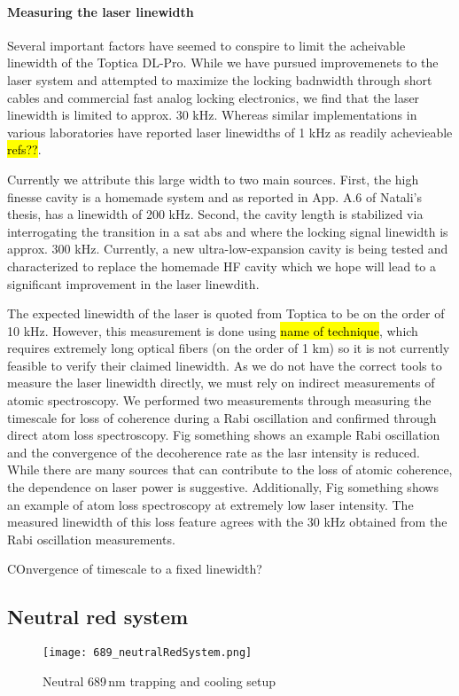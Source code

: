 \paragraph{Measuring the laser linewidth}
Several important factors have seemed to conspire to limit the acheivable linewidth of the Toptica DL-Pro.
While we have pursued improvemenets to the laser system and attempted to maximize the locking badnwidth through short cables and commercial fast analog locking electronics, we find that the laser linewidth is limited to approx. 30 kHz.
Whereas similar implementations in various laboratories have reported laser linewidths of 1 kHz as readily achevieable \hl{refs??}.

Currently we attribute this large width to two main sources. 
First, the high finesse cavity is a homemade system and as reported in App. A.6 of Natali's thesis, has a linewidth of 200 kHz. 
Second, the cavity length is stabilized via interrogating the transition in a sat abs and where the locking signal linewidth is approx. 300 kHz.
Currently, a new ultra-low-expansion cavity is being tested and characterized to replace the homemade HF cavity which we hope will lead to a significant improvement in the laser linewdith.

The expected linewidth of the laser is quoted from Toptica to be on the order of 10 kHz.
However, this measurement is done using \hl{name of technique}, which requires extremely long optical fibers (on the order of 1 km) so it is not currently feasible to verify their claimed linewidth.
As we do not have the correct tools to measure the laser linewidth directly, we must rely on indirect measurements of atomic spectroscopy.
We performed two measurements through measuring the timescale for loss of coherence during a Rabi oscillation and confirmed through direct atom loss spectroscopy.
Fig something shows an example Rabi oscillation and the convergence of the decoherence rate as the lasr intensity is reduced.
While there are many sources that can contribute to the loss of atomic coherence, the dependence on laser power is suggestive.
Additionally, Fig something shows an example of atom loss spectroscopy at extremely low laser intensity.
The measured linewidth of this loss feature agrees with the 30 kHz obtained from the Rabi oscillation measurements.

COnvergence of timescale to a fixed linewidth?

\subsection{Neutral red system}
	\begin{figure} 
		\centerline{
		\texttt{[image: 689\_neutralRedSystem.png]}}
		\caption{Neutral 689\,nm trapping and cooling setup}{}
		\label{fig:neutralRed}
	\end{figure}
	
